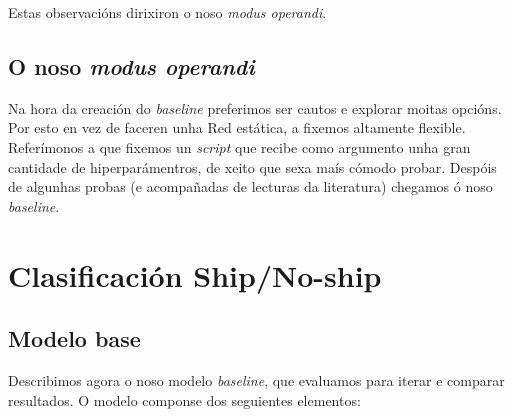 \documentclass{article}
\begin{document}
Estas observacións dirixiron o noso \emph{modus operandi}.

\subsection{O noso \emph{modus operandi}}

Na hora da creación do \emph{baseline} preferimos ser cautos e explorar moitas opcións. Por esto en vez de faceren unha Red estática, a fixemos altamente flexible. Referímonos a que fixemos un \emph{script} que recibe como argumento unha gran cantidade de hiperparámentros, de xeito que sexa maís cómodo probar. Despóis de algunhas probas (e acompañadas de lecturas da literatura) chegamos ó noso \emph{baseline}.

\section{Clasificación Ship/No-ship}
\subsection{Modelo base}

Describimos agora o noso modelo \emph{baseline}, que evaluamos para iterar e comparar resultados. O modelo componse dos seguientes elementos:
\end{document}
